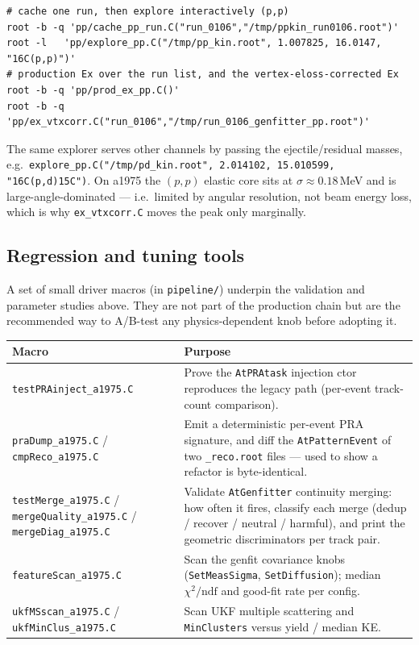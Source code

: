 \documentclass[11pt,a4paper]{article}
\newcommand{\code}[1]{\texttt{\small #1}}
\newcommand{\file}[1]{\texttt{\small #1}}
\begin{document}
\begin{lstlisting}[style=bash]
# cache one run, then explore interactively (p,p)
root -b -q 'pp/cache_pp_run.C("run_0106","/tmp/ppkin_run0106.root")'
root -l   'pp/explore_pp.C("/tmp/pp_kin.root", 1.007825, 16.0147, "16C(p,p)")'
# production Ex over the run list, and the vertex-eloss-corrected Ex
root -b -q 'pp/prod_ex_pp.C()'
root -b -q 'pp/ex_vtxcorr.C("run_0106","/tmp/run_0106_genfitter_pp.root")'
\end{lstlisting}

\begin{notebox}
The same explorer serves other channels by passing the ejectile/residual masses,
e.g.\ \code{explore\_pp.C("/tmp/pd\_kin.root", 2.014102, 15.010599, "16C(p,d)15C")}.
On a1975 the $(p,p)$ elastic core sits at $\sigma\!\approx\!0.18$\,MeV and is
large-angle-dominated --- i.e.\ limited by angular resolution, not beam energy
loss, which is why \file{ex\_vtxcorr.C} moves the peak only marginally.
\end{notebox}

\subsection{Regression and tuning tools}\label{sec:tools}

A set of small driver macros (in \file{pipeline/}) underpin the validation and
parameter studies above. They are not part of the production chain but are the
recommended way to A/B-test any physics-dependent knob before adopting it.

\begin{longtable}{@{}p{4.2cm} p{10.4cm}@{}}
\toprule
\textbf{Macro} & \textbf{Purpose} \\
\midrule
\endhead
\file{testPRAinject\_a1975.C} & Prove the \code{AtPRAtask} injection ctor reproduces the legacy path (per-event track-count comparison). \\
\file{praDump\_a1975.C} / \file{cmpReco\_a1975.C} & Emit a deterministic per-event PRA signature, and diff the \code{AtPatternEvent} of two \file{\_reco.root} files --- used to show a refactor is byte-identical. \\
\file{testMerge\_a1975.C} / \file{mergeQuality\_a1975.C} / \file{mergeDiag\_a1975.C} & Validate \code{AtGenfitter} continuity merging: how often it fires, classify each merge (dedup / recover / neutral / harmful), and print the geometric discriminators per track pair. \\
\file{featureScan\_a1975.C} & Scan the genfit covariance knobs (\code{SetMeasSigma}, \code{SetDiffusion}); median $\chi^2/\mathrm{ndf}$ and good-fit rate per config. \\
\file{ukfMSscan\_a1975.C} / \file{ukfMinClus\_a1975.C} & Scan UKF multiple scattering and \code{MinClusters} versus yield / median KE. \\
\bottomrule
\end{longtable}
\end{document}
